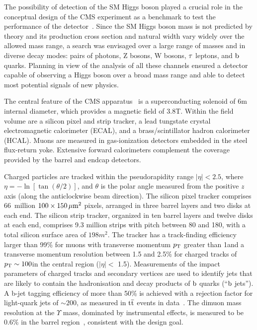 \documentclass[11pt,twoside,a4paper,cmspaper,final]{cms-tdr}
\begin{document}
The possibility of detection of the SM Higgs boson played a crucial role in the conceptual design of the
CMS experiment as a benchmark to test the performance of the
detector~\cite{Pimia:1990zy,DellaNegra:1992hp,Ellis:1994sq}.
Since the SM Higgs boson
mass is not predicted by theory and its production cross section and natural width vary widely
over the allowed mass range, a search was envisaged over a large range of masses and in
diverse decay modes: pairs of photons, Z bosons, W bosons, $\tau$ leptons, and $\mathrm{b}$
quarks. Planning in view of the analysis of all these channels ensured a detector capable of
observing a Higgs boson over a broad mass range
and able to detect most potential signals of new physics.

The central feature of the CMS apparatus~\cite{Chatrchyan:2008zzk}
is a superconducting solenoid of 6\unit{m}
internal diameter, which provides a magnetic field of 3.8\unit{T}. Within the field volume are a
silicon pixel and strip tracker, a lead tungstate crystal electromagnetic calorimeter (ECAL),
and a brass/scintillator hadron calorimeter (HCAL). Muons are measured in gas-ionization
detectors embedded in the steel flux-return yoke. Extensive forward calorimeters complement
the coverage provided by the barrel and endcap detectors.

Charged particles are tracked within the pseudorapidity range
$|\eta|<2.5$, where
$\eta=-\ln[\tan(\theta/2)]$,
and $\theta$ is the
polar angle measured from the positive $z$ axis (along the anticlockwise beam direction).
The silicon pixel
tracker comprises 66~million $100\times150\,\mu\text{m}^2$ pixels, arranged in three barrel
layers and two disks at each end. The silicon strip tracker, organized in ten barrel
layers and twelve disks at each end, comprises 9.3 million strips with pitch between 80 and
180\mum, with a total silicon surface area of $198\unit{m}^2$. The tracker has a
track-finding efficiency larger than 99\% for muons with transverse momentum
$p_{\mathrm{T}}$ greater than 1\GeV and a transverse momentum resolution
between 1.5 and 2.5\% for charged tracks of $p_{\mathrm{T}} \sim 100$\GeV in the
central region ($|\eta| <$ 1.5).
Measurements of the impact parameters of charged tracks and secondary vertices are used to
identify jets that are likely to contain the hadronisation and decay
products of $\mathrm{b}$ quarks (``$\mathrm{b}$ jets'').
A b-jet tagging efficiency of more than 50\% is achieved with a
rejection factor for light-quark jets of ${\sim}200$, as measured in $\mathrm{t}\overline{\mathrm{t}}$ events in data~\cite{CMS-PAS-BTV-11-004}.
The dimuon mass resolution at the $\Upsilon$ mass, dominated by
instrumental effects, is measured to be 0.6\% in the barrel region~\cite{PhysRevD.83.112004}, consistent with the design
goal.
\end{document}
